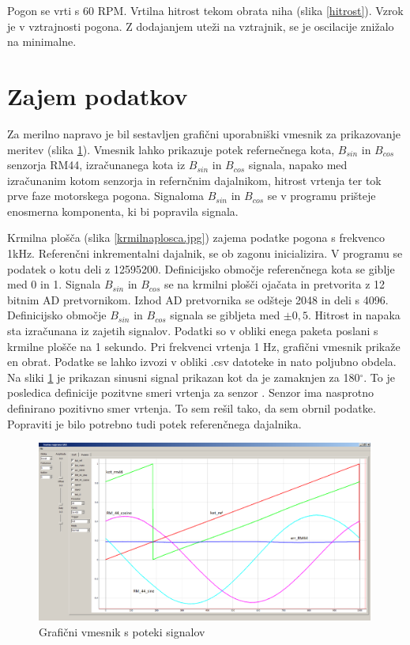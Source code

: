 Pogon se vrti s 60 RPM. Vrtilna hitrost tekom obrata niha (slika \ref{hitrost}). Vzrok je v vztrajnosti pogona. Z dodajanjem uteži na vztrajnik, se je oscilacije znižalo na minimalne.
\newpage
\section{Zajem podatkov}
Za merilno napravo je bil sestavljen grafični uporabniški vmesnik za prikazovanje meritev (slika \ref{GUI.png}).
Vmesnik lahko prikazuje potek refernečnega kota, $B_{sin}$ in $B_{cos}$ senzorja RM44, izračunanega kota iz $B_{sin}$ in $B_{cos}$ signala, napako med izračunanim kotom senzorja in refernčnim dajalnikom, hitrost vrtenja ter tok prve faze motorskega pogona. Signaloma $B_{sin}$ in $B_{cos}$ se v programu prišteje enosmerna komponenta, ki bi popravila signala.

Krmilna plošča (slika \ref{krmilnaplosca.jpg}) zajema podatke pogona s frekvenco 1kHz.
Referenčni inkrementalni dajalnik, se ob zagonu inicializira. V programu se podatek o kotu deli z 12595200. Definicijsko območje referenčnega kota se giblje med 0 in 1.
Signala $B_{sin}$ in $B_{cos}$  se na krmilni plošči ojačata in pretvorita z 12 bitnim AD pretvornikom. Izhod AD pretvornika se odšteje 2048 in deli s 4096. Definicijsko območje  $B_{sin}$ in $B_{cos}$  signala se gibljeta med $\pm0,5$.
Hitrost in napaka sta izračunana iz zajetih signalov.
Podatki so v obliki enega paketa poslani s krmilne plošče na 1 sekundo. Pri frekvenci vrtenja 1 Hz, grafični vmesnik prikaže en obrat.
Podatke se lahko izvozi v obliki .csv datoteke in nato poljubno obdela.
Na sliki  \ref{GUI.png} je prikazan sinusni signal prikazan kot da je zamaknjen za 180$\mathrm{^\circ}$. To je posledica definicije pozitvne smeri vrtenja za senzor \cite{RM44}. Senzor ima nasprotno definirano pozitivno smer vrtenja. To sem rešil tako, da sem obrnil podatke. Popraviti je bilo potrebno tudi potek referenčnega dajalnika.
\begin{figure}[!ht]
	\centering
	\includegraphics[width=0.99\textwidth]{./Slike/GUI.png}
	\caption{Grafični vmesnik s poteki signalov}
	\label{GUI.png}
\end{figure}

